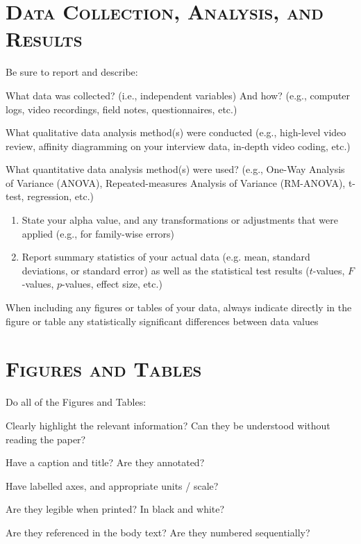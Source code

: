 \documentclass[12pt]{article} %
\begin{document}
\noindent\makebox[\linewidth]{\rule{\linewidth}{0.4pt}}
\section*{\textsc{Data Collection, Analysis, and Results}}

Be sure to report and describe: 
\begin{checklist}
	\item What data was collected? (i.e., independent variables) And how? (e.g., computer logs, video recordings, field notes, questionnaires, etc.) 

	\item What qualitative data analysis method(s) were conducted (e.g., high-level video review, affinity diagramming on your interview data, in-depth video coding, etc.)
	
	\item What quantitative data analysis method(s) were used? (e.g., One-Way Analysis of Variance (ANOVA), Repeated-measures Analysis of Variance (RM-ANOVA), t-test, regression, etc.) 	
	
	\begin{enumerate}
 		\item State your alpha value, and any transformations or adjustments that were applied (e.g., for family-wise errors)
		\item Report summary statistics of your actual data (e.g. mean, standard deviations, or standard error) as well as the statistical test results ($t$-values, $F$-values, $p$-values, effect size, etc.)
	\end{enumerate}
	\item When including any figures or tables of your data, always indicate directly in the figure or table any statistically significant differences between data values
\end{checklist}


\newpage
\section*{\textsc{Figures and Tables}}
\vspace{0.5cm}
Do all of the Figures and Tables:
\begin{checklist}
	\item Clearly highlight the relevant information? Can they be understood without reading the paper? 
	\item Have a caption and title? Are they annotated? 
	\item Have labelled axes, and appropriate units / scale?
	\item Are they legible when printed? In black and white?
	\item Are they referenced in the body text? Are they numbered sequentially?
\end{checklist}
\end{document}
